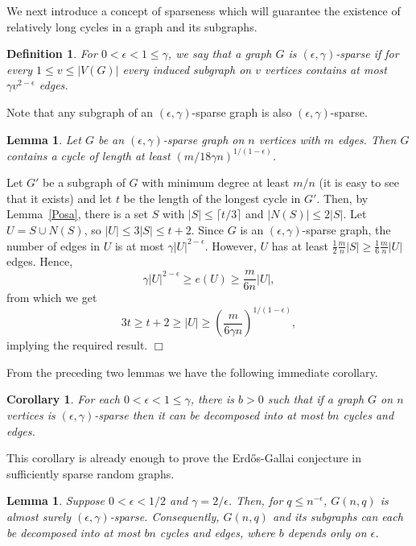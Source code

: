 \documentclass[11pt]{article}
\newtheorem{lemma}[theorem]{Lemma}
\newtheorem{corollary}[theorem]{Corollary}
\newtheorem{definition}{Definition}
\newenvironment{proof}
      {\medskip\noindent{\bf Proof:}\hspace{1mm}}
      {\hfill$\Box$\medskip}
\begin{document}
We next introduce a concept of sparseness which will guarantee the existence of relatively long cycles in a graph and its subgraphs.

\begin{definition}\label{defsparse1}
For $0<\epsilon < 1 \leq \gamma$, we say that a graph $G$ is $(\epsilon,\gamma)$-sparse if for every $1 \leq v \leq |V(G)|$ every induced subgraph on $v$ vertices contains at most $\gamma v^{2-\epsilon}$ edges.
\end{definition}

Note that any subgraph of an $(\epsilon,\gamma)$-sparse graph is also $(\epsilon,\gamma)$-sparse.

\begin{lemma}
Let $G$ be an $(\epsilon,\gamma)$-sparse graph on $n$ vertices with $m$ edges. Then $G$ contains a cycle of length at least $(m/18 \gamma n)^{1/(1-\epsilon)}$.
\end{lemma}
\begin{proof}
Let $G'$ be a subgraph of $G$ with minimum degree at least $m/n$ (it is easy to see that it exists) and let $t$
be the length of the longest cycle in $G'$. Then, by Lemma~\ref{Posa}, there is a set $S$ with $|S| \leq \lceil t/3 \rceil$ and $|N(S)| \leq 2|S|$. Let $U=S \cup N(S)$, so $|U| \leq 3|S| \leq t+ 2$.
Since $G$ is an $(\epsilon,\gamma)$-sparse graph, the number of edges in $U$ is at most $\gamma|U|^{2-\epsilon}$. However, $U$ has at least $\frac{1}{2}\frac{m}{n}|S| \geq \frac{1}{6}\frac{m}{n}|U| $ edges. Hence,
$$\gamma |U|^{2-\epsilon} \geq e(U) \geq \frac{m}{6n}|U|,$$
from which we get $$3t \geq t + 2 \geq |U| \geq \left(\frac{m}{6\gamma n}\right)^{1/(1-\epsilon)},$$
implying the required result.
\end{proof}

From the preceding two lemmas we have the following immediate corollary.

\begin{corollary} \label{bcor}
For each $0< \epsilon < 1 \leq \gamma$, there is $b > 0$ such that if a graph $G$ on $n$ vertices is $(\epsilon,\gamma)$-sparse then it can be decomposed into at most $b n$ cycles and edges.
\end{corollary}

This corollary is already enough to prove the Erd\H{o}s-Gallai conjecture in sufficiently sparse random graphs.

\begin{lemma}\label{gnqlem}
Suppose $0< \epsilon<1/2$ and $\gamma = 2/\epsilon$. Then, for $q \leq n^{-\epsilon}$, $G(n,q)$ is almost surely $(\epsilon,\gamma)$-sparse. Consequently, $G(n,q)$ and its subgraphs can each be decomposed into at most $b n$ cycles and edges, where $b$ depends only on $\epsilon$.
\end{lemma}
\end{document}
